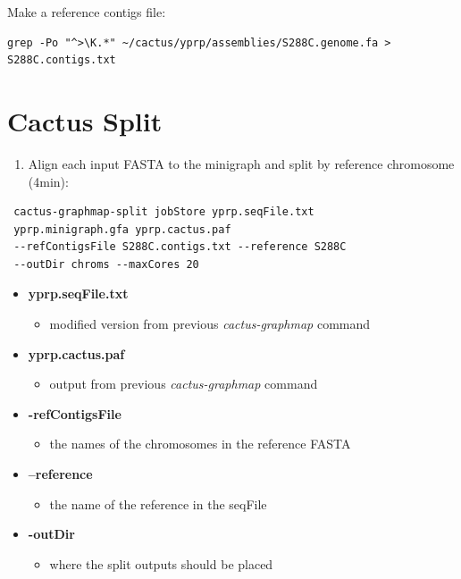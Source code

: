 \documentclass[
]{book}
\providecommand{\tightlist}{%
  \setlength{\itemsep}{0pt}\setlength{\parskip}{0pt}}
\begin{document}
Make a reference contigs file:

\begin{verbatim}
grep -Po "^>\K.*" ~/cactus/yprp/assemblies/S288C.genome.fa >
S288C.contigs.txt
\end{verbatim}

\hypertarget{cactus-split}{%
\section{Cactus Split}\label{cactus-split}}

\begin{enumerate}
\def\labelenumi{\arabic{enumi}.}
\tightlist
\item
  Align each input FASTA to the minigraph and split by reference chromosome (4min):
\end{enumerate}

\begin{verbatim}
 cactus-graphmap-split jobStore yprp.seqFile.txt
 yprp.minigraph.gfa yprp.cactus.paf
 --refContigsFile S288C.contigs.txt --reference S288C
 --outDir chroms --maxCores 20
\end{verbatim}

\begin{itemize}
\tightlist
\item
  \textbf{yprp.seqFile.txt}

  \begin{itemize}
  \tightlist
  \item
    modified version from previous \emph{cactus-graphmap} command
  \end{itemize}
\item
  \textbf{yprp.cactus.paf}

  \begin{itemize}
  \tightlist
  \item
    output from previous \emph{cactus-graphmap} command
  \end{itemize}
\item
  \textbf{-refContigsFile}

  \begin{itemize}
  \tightlist
  \item
    the names of the chromosomes in the reference FASTA
  \end{itemize}
\item
  \textbf{--reference}

  \begin{itemize}
  \tightlist
  \item
    the name of the reference in the seqFile
  \end{itemize}
\item
  \textbf{-outDir}

  \begin{itemize}
  \tightlist
  \item
    where the split outputs should be placed
  \end{itemize}
\end{itemize}
\end{document}
